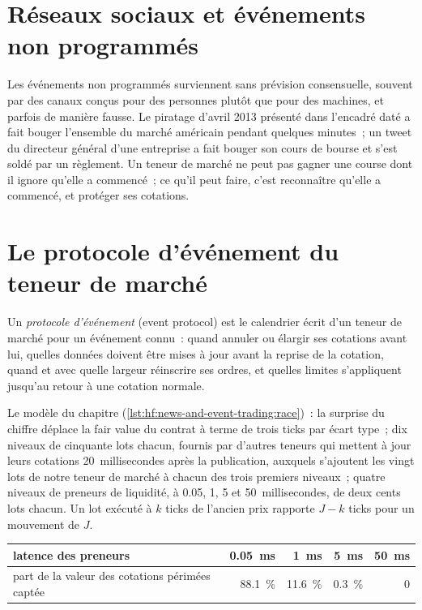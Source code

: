 \section{Réseaux sociaux et événements non programmés}

Les événements non programmés surviennent sans prévision consensuelle, souvent par des canaux conçus pour des personnes plutôt que pour des machines, et parfois de manière fausse. Le
piratage d'avril 2013 présenté dans l'encadré daté a fait bouger l'ensemble du marché américain pendant quelques minutes~; un tweet du directeur général d'une entreprise a fait bouger son cours de bourse et s'est soldé par un
règlement. Un teneur de marché ne peut pas gagner une course dont il ignore qu'elle a commencé~; ce qu'il peut faire, c'est reconnaître qu'elle a commencé, et protéger ses cotations.

\section{Le protocole d'événement du teneur de marché}

\begin{definition}\label{def:hf:news-and-event-trading:protocol}
Un \emph{protocole d'événement} (event protocol) est le calendrier écrit d'un teneur de marché pour un événement connu~: quand annuler ou élargir ses cotations avant lui,
quelles données doivent être mises à jour avant la reprise de la cotation, quand et avec quelle largeur réinscrire ses ordres, et quelles limites s'appliquent jusqu'au retour à une cotation normale.
\end{definition}

Le modèle du chapitre (\cref{lst:hf:news-and-event-trading:race})~: la surprise du chiffre déplace la fair value du contrat à terme de trois ticks par
écart type~; dix niveaux de cinquante lots chacun, fournis par d'autres teneurs qui mettent à jour leurs cotations 20~millisecondes après la publication, auxquels s'ajoutent les vingt lots de notre teneur de marché à chacun des
trois premiers niveaux~; quatre niveaux de preneurs de liquidité, à 0.05, 1, 5 et 50~millisecondes, de deux cents lots chacun. Un lot exécuté à $k$ ticks de l'ancien prix
rapporte $J-k$ ticks pour un mouvement de $J$.

\begin{center}
\small
\begin{tabular}{@{}lrrrr@{}}
\toprule
latence des preneurs & 0.05~ms & 1~ms & 5~ms & 50~ms\\
\midrule
part de la valeur des cotations périmées captée & 88.1~\% & 11.6~\% & 0.3~\% & 0\\
\bottomrule
\end{tabular}
\end{center}

